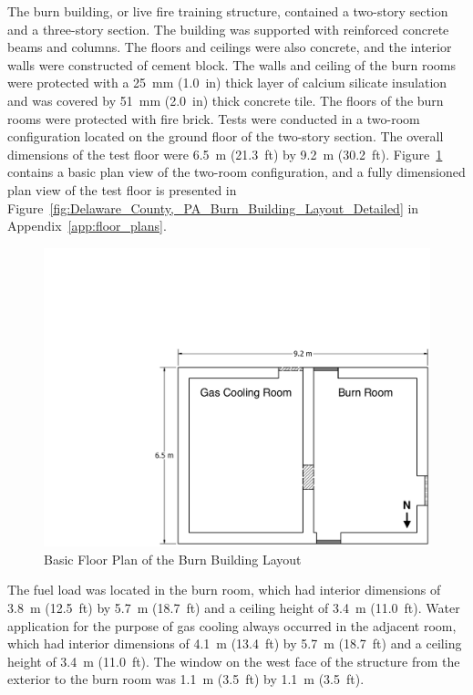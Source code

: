 \documentclass[12pt,oneside]{book}
\begin{document}
The burn building, or live fire training structure, contained a two-story section and a three-story section. The building was supported with reinforced concrete beams and columns. The floors and ceilings were also concrete, and the interior walls were constructed of cement block. The walls and ceiling of the burn rooms were protected with a 25~mm (1.0~in) thick layer of calcium silicate insulation and was covered by 51~mm (2.0~in) thick concrete tile. The floors of the burn rooms were protected with fire brick. Tests were conducted in a two-room configuration located on the ground floor of the two-story section. The overall dimensions of the test floor were 6.5~m (21.3~ft) by 9.2~m (30.2~ft). Figure~\ref{fig:Delaware_County,_PA_Burn_Building_Layout} contains a basic plan view of the two-room configuration, and a fully dimensioned plan view of the test floor is presented in Figure~\ref{fig:Delaware_County,_PA_Burn_Building_Layout_Detailed} in Appendix~\ref{app:floor_plans}.

\begin{figure}[!ht]
	\includegraphics[width=\columnwidth]{../Figures/Floor_Plans/PDFs/West_Structure/DelCo_2012_West_Structure_Plain}
	\caption{Basic Floor Plan of the Burn Building Layout}
	\label{fig:Delaware_County,_PA_Burn_Building_Layout}
\end{figure}

The fuel load was located in the burn room, which had interior dimensions of 3.8~m (12.5~ft) by 5.7~m (18.7~ft) and a ceiling height of 3.4~m (11.0~ft). Water application for the purpose of gas cooling always occurred in the adjacent room, which had interior dimensions of 4.1~m (13.4~ft) by 5.7~m (18.7~ft) and a ceiling height of 3.4~m (11.0~ft). The window on the west face of the structure from the exterior to the burn room was 1.1~m (3.5~ft) by 1.1~m (3.5~ft).
\end{document}
